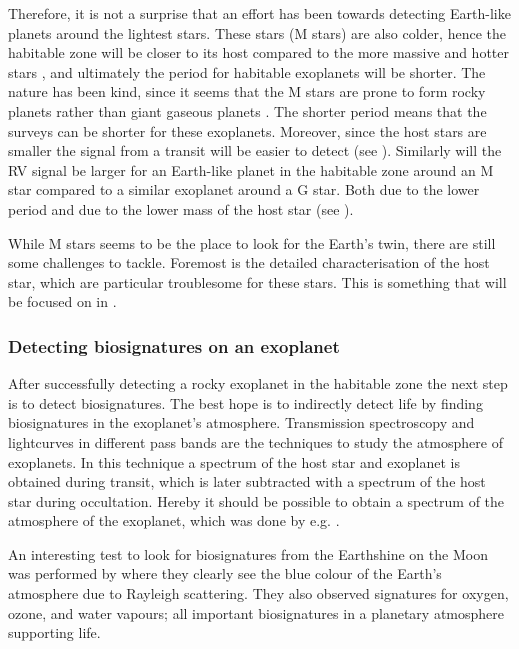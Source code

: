 Therefore, it is not a surprise that an effort has been towards detecting Earth-like planets around
the lightest stars. These stars (M stars) are also colder, hence the habitable zone will be closer
to its host compared to the more massive and hotter stars \citep{Kasting1997}, and ultimately the
period for habitable exoplanets will be shorter. The nature has been kind, since it seems that the M
stars are prone to form rocky planets rather than giant gaseous planets
\citep{Bonfils2013,Delfosse2013}. The shorter period means that the surveys can be shorter for these
exoplanets. Moreover, since the host stars are smaller the signal from a transit will be easier to
detect (see ). Similarly will the RV signal be larger for an Earth-like planet in
the habitable zone around an M star compared to a similar exoplanet around a G star. Both due to the
lower period and due to the lower mass of the host star (see ).

While M stars seems to be the place to look for the Earth's twin, there are still some challenges to
tackle. Foremost is the detailed characterisation of the host star, which are particular troublesome
for these stars. This is something that will be focused on in .

\subsubsection{Detecting biosignatures on an exoplanet}

After successfully detecting a rocky exoplanet in the habitable zone the next step is to detect
biosignatures. The best hope is to indirectly detect life by finding biosignatures
\citep{Kasting2002} in the exoplanet's atmosphere. Transmission spectroscopy and lightcurves in
different pass bands are the techniques to study the atmosphere of exoplanets. In this technique a
spectrum of the host star and exoplanet is obtained during transit, which is later subtracted with a
spectrum of the host star during occultation. Hereby it should be possible to obtain a spectrum of
the atmosphere of the exoplanet, which was done by e.g. \citet{Charbonneau2002}.

An interesting test to look for biosignatures from the Earthshine on the Moon was performed by
\citet{Arnold2002} where they clearly see the blue colour of the Earth's atmosphere due to Rayleigh
scattering. They also observed signatures for oxygen, ozone, and water vapours; all important
biosignatures in a planetary atmosphere supporting life.

